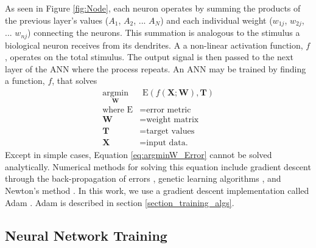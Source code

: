 As seen in Figure \ref{fig:Node}, each neuron operates by summing the products of the previous layer's values ($A{_1}$, $A{_2}$, ... $A{_N}$) and each individual weight ($w_{1j}$, $w_{2j}$, ... $w_{nj}$) connecting the neurons. This summation is analogous to the stimulus a biological neuron receives from its dendrites. A a non-linear activation function, $f$, operates on the total stimulus. The output signal is then passed to the next layer of the ANN where the process repeats. An ANN may be trained by finding a function, $f$, that solves
%
\begin{align} \label{eq:argminW_Error}
\underset{\mathbf{W}}{\text{argmin}} &{\text{ E}}(f(\mathbf{X} ; \mathbf{W} ) , \mathbf{T} ) \\
\text{where E} &= \text{error metric} \nonumber \\
\mathbf{W} &= \text{weight matrix} \nonumber \\
\mathbf{T} &= \text{target values} \nonumber \\
\mathbf{X} &= \text{input data.} \nonumber
\end{align}
%
Except in simple cases, Equation \ref{eq:argminW_Error} cannot be solved analytically. Numerical methods for solving this equation include gradient descent through the back-propagation of errors \cite{Rumelhart1986}, genetic learning algorithms \cite{Yao1999}, and Newton's method \cite{Fletcher2000}. In this work, we use a gradient descent implementation called Adam \cite{Kingma2015}. Adam is described in section \ref{section_training_algs}.

\subsection{Neural Network Training}

